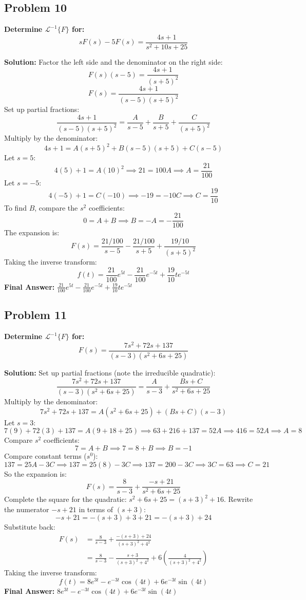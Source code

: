 \documentclass[11pt, a4paper]{article}
\theoremstyle{definition}
\theoremstyle{remark}
\newcommand{\InvLaplace}{\mathcal{L}^{-1}}
\begin{document}
\subsection*{Problem 10}
\textbf{Determine $\InvLaplace\{F\}$ for:}
\[ s F(s) - 5 F(s) = \frac{4s + 1}{s^2 + 10s + 25} \]

\textbf{Solution:}
Factor the left side and the denominator on the right side:
\[ F(s)(s - 5) = \frac{4s + 1}{(s+5)^2} \]
\[ F(s) = \frac{4s + 1}{(s-5)(s+5)^2} \]
Set up partial fractions:
\[ \frac{4s + 1}{(s-5)(s+5)^2} = \frac{A}{s-5} + \frac{B}{s+5} + \frac{C}{(s+5)^2} \]
Multiply by the denominator:
\[ 4s + 1 = A(s+5)^2 + B(s-5)(s+5) + C(s-5) \]
Let $s = 5$:
\[ 4(5) + 1 = A(10)^2 \implies 21 = 100A \implies A = \frac{21}{100} \]
Let $s = -5$:
\[ 4(-5) + 1 = C(-10) \implies -19 = -10C \implies C = \frac{19}{10} \]
To find $B$, compare the $s^2$ coefficients:
\[ 0 = A + B \implies B = -A = -\frac{21}{100} \]
The expansion is:
\[ F(s) = \frac{21/100}{s-5} - \frac{21/100}{s+5} + \frac{19/10}{(s+5)^2} \]
Taking the inverse transform:
\[ f(t) = \frac{21}{100}e^{5t} - \frac{21}{100}e^{-5t} + \frac{19}{10}te^{-5t} \]
\textbf{Final Answer:} $\frac{21}{100}e^{5t} - \frac{21}{100}e^{-5t} + \frac{19}{10}te^{-5t}$

\subsection*{Problem 11}
\textbf{Determine $\InvLaplace\{F\}$ for:}
\[ F(s) = \frac{7s^2 + 72s + 137}{(s-3)(s^2 + 6s + 25)} \]

\textbf{Solution:}
Set up partial fractions (note the irreducible quadratic):
\[ \frac{7s^2 + 72s + 137}{(s-3)(s^2 + 6s + 25)} = \frac{A}{s-3} + \frac{Bs+C}{s^2 + 6s + 25} \]
Multiply by the denominator:
\[ 7s^2 + 72s + 137 = A(s^2 + 6s + 25) + (Bs+C)(s-3) \]
Let $s = 3$:
\[ 7(9) + 72(3) + 137 = A(9 + 18 + 25) \implies 63 + 216 + 137 = 52A \implies 416 = 52A \implies A = 8 \]
Compare $s^2$ coefficients:
\[ 7 = A + B \implies 7 = 8 + B \implies B = -1 \]
Compare constant terms ($s^0$):
\[ 137 = 25A - 3C \implies 137 = 25(8) - 3C \implies 137 = 200 - 3C \implies 3C = 63 \implies C = 21 \]
So the expansion is:
\[ F(s) = \frac{8}{s-3} + \frac{-s+21}{s^2 + 6s + 25} \]
Complete the square for the quadratic: $s^2 + 6s + 25 = (s+3)^2 + 16$.
Rewrite the numerator $-s+21$ in terms of $(s+3)$:
\[ -s + 21 = -(s+3) + 3 + 21 = -(s+3) + 24 \]
Substitute back:
\begin{align*}
    F(s) &= \frac{8}{s-3} + \frac{-(s+3) + 24}{(s+3)^2 + 4^2} \\
    &= \frac{8}{s-3} - \frac{s+3}{(s+3)^2 + 4^2} + 6 \left( \frac{4}{(s+3)^2 + 4^2} \right)
\end{align*}
Taking the inverse transform:
\[ f(t) = 8e^{3t} - e^{-3t}\cos(4t) + 6e^{-3t}\sin(4t) \]
\textbf{Final Answer:} $8e^{3t} - e^{-3t}\cos(4t) + 6e^{-3t}\sin(4t)$
\end{document}
